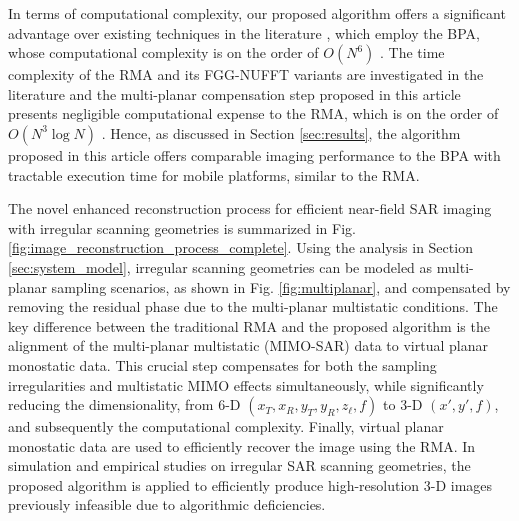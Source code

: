 \documentclass{ieeeaccess}
\begin{document}
In terms of computational complexity, our proposed algorithm offers a significant advantage over existing techniques in the literature \cite{alvarez2019freehand,alvarez2021freehand,alvarez2021freehandsystem,alvarez2021system,alvarez2021towards,garcia20203DSARProcessing,wu2020multilayered}, which employ the BPA, whose computational complexity is on the order of $O(N^6)$ \cite{yanik2020development,fan2020linearMIMOArbitraryTopologies}. 
The time complexity of the RMA and its FGG-NUFFT variants are investigated in the literature \cite{fan2020linearMIMOArbitraryTopologies,wang20203} and the multi-planar compensation step proposed in this article presents negligible computational expense to the RMA, which is on the order of $O(N^3 \log{N})$ \cite{lopez20003,sheen2001three}.
Hence, as discussed in Section \ref{sec:results}, the algorithm proposed in this article offers comparable imaging performance to the BPA with tractable execution time for mobile platforms, similar to the RMA.

The novel enhanced reconstruction process for efficient near-field SAR imaging with irregular scanning geometries is summarized in Fig. \ref{fig:image_reconstruction_process_complete}.
Using the analysis in Section \ref{sec:system_model}, irregular scanning geometries can be modeled as multi-planar sampling scenarios, as shown in Fig. \ref{fig:multiplanar}, and compensated by removing the residual phase due to the multi-planar multistatic conditions. 
The key difference between the traditional RMA and the proposed algorithm is the alignment of the multi-planar multistatic (MIMO-SAR) data to virtual planar monostatic data. 
This crucial step compensates for both the sampling irregularities and multistatic MIMO effects simultaneously, while significantly reducing the dimensionality, from \mbox{6-D} $(x_T,x_R,y_T,y_R,z_\ell,f)$ to \mbox{3-D} $(x',y',f)$, and subsequently the computational complexity. 
Finally, virtual planar monostatic data are used to efficiently recover the image using the RMA.
In simulation and empirical studies on irregular SAR scanning geometries, the proposed algorithm is applied to efficiently produce high-resolution \mbox{3-D} images previously infeasible due to algorithmic deficiencies. 
\end{document}
